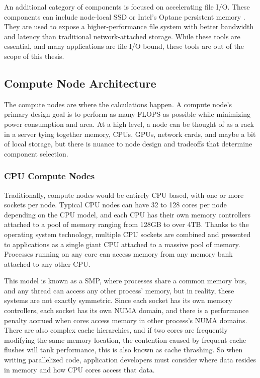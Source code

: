 An additional category of components is focused on accelerating file I/O.
These components can include node-local \gls{SSD} or Intel's Optane persistent memory \cite{Weiland2019EvalOfOptaneForSciApps}. 
They are used to expose a higher-performance file system with better bandwidth and latency than traditional network-attached storage.
While these tools are essential, and many applications are file I/O bound, these tools are out of the scope of this thesis. 

\subsection{Compute Node Architecture}
The compute nodes are where the calculations happen.
A compute node's primary design goal is to perform as many \gls{FLOPS} as possible while minimizing power consumption and area.
At a high level, a node can be thought of as a rack in a server tying together memory, \gls{CPU}s, \gls{GPU}s, network cards, and maybe a bit of local storage, but there is nuance to node design and tradeoffs that determine component selection. 

\subsubsection{CPU Compute Nodes}
Traditionally, compute nodes would be entirely \gls{CPU} based, with one or more sockets per node.
Typical \gls{CPU} nodes can have 32 to 128 cores per node depending on the \gls{CPU} model, and each \gls{CPU} has their own memory controllers attached to a pool of memory ranging from 128GB to over 4TB.
Thanks to the operating system technology, multiple \gls{CPU} sockets are combined and presented to applications as a single giant \gls{CPU} attached to a massive pool of memory. 
Processes running on any core can access memory from any memory bank attached to any other \gls{CPU}.

This model is known as a \gls{SMP}, where processes share a common memory bus, and any thread can access any other process' memory, but in reality, these systems are not exactly symmetric.
Since each socket has its own memory controllers, each socket has its own \gls{NUMA} domain, and there is a performance penalty accrued when cores access memory in other process's \gls{NUMA} domains.
There are also complex cache hierarchies, and if two cores are frequently modifying the same memory location, the contention caused by frequent cache flushes will tank performance, this is also known as cache thrashing.
So when writing parallelized code, application developers must consider where data resides in memory and how \gls{CPU} cores access that data.
 

